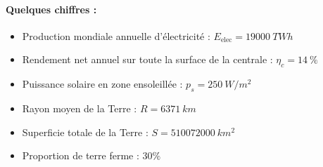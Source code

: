 \documentclass[10pt,fleqn]{article} %
\begin{document}
\paragraph{Quelques chiffres : }
\begin{itemize}
    \item Production mondiale annuelle d'électricité : $E_\text{elec} = \SI{19000}{TWh}$
    \item Rendement net annuel sur toute la surface de la centrale : $\eta_c = \SI{14}{\%}$
    \item Puissance solaire en zone ensoleillée : $p_s = \SI{250}{W/m^2}$
    \item Rayon moyen de la Terre : $R = \SI{6371}{km}$
    \item Superficie totale de la Terre : $S = \SI{510072000}{km^2}$
    \item Proportion de terre ferme : $30\%$
\end{itemize}
\end{document}
